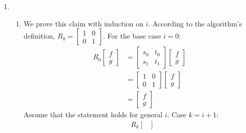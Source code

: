 \documentclass[11pt,a4paper]{article}
\begin{document}
\begin{enumerate}
	\item
	      \begin{enumerate}
		      \item We prove this claim with induction on $i$. According to the algorithm's definition, $R_0 = \begin{bmatrix}
				            1 & 0 \\ 0 & 1
			            \end{bmatrix}$. For the base case $i = 0$:
		            \begin{align*}
			            R_0\begin{bmatrix}
				               f \\
				               g
			               \end{bmatrix} & = \begin{bmatrix}
				                                 s_0 & t_0 \\
				                                 s_1 & t_1
			                                 \end{bmatrix} \begin{bmatrix}
				                                               f \\ g
			                                               \end{bmatrix}   \\
			                               & = \begin{bmatrix}
				                                   1 & 0 \\
				                                   0 & 1
			                                   \end{bmatrix} \begin{bmatrix}
				                                                 f \\ g
			                                                 \end{bmatrix} \\
			                               & = \begin{bmatrix}
				                                   f \\ g
			                                   \end{bmatrix}
		            \end{align*}
		            Assume that the statement holds for general $i$. Case $k = i + 1$:
		            \begin{align*}
			                                                                    & R_k\begin{bmatrix}

\end{bmatrix}
\end{align*}
\end{enumerate}
\end{enumerate}
\end{document}
